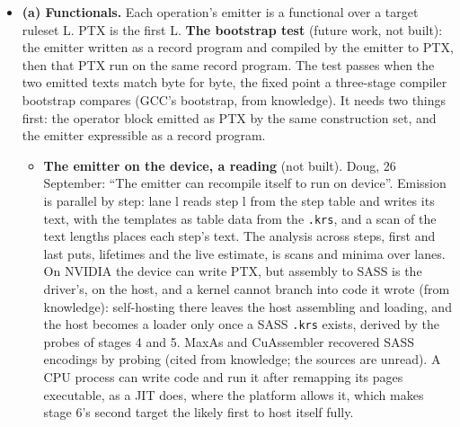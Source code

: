 \begin{enumerate}
\begin{itemize}
\item \textbf{(a) Functionals.} Each operation's emitter is a functional over a target ruleset L. PTX is the first L. \textbf{The bootstrap test} (future work, not built): the emitter written as a record program and compiled by the emitter to PTX, then that PTX run on the same record program. The test passes when the two emitted texts match byte for byte, the fixed point a three-stage compiler bootstrap compares (GCC's bootstrap, from knowledge). It needs two things first: the operator block emitted as PTX by the same construction set, and the emitter expressible as a record program.

\begin{itemize}
\item \textbf{The emitter on the device, a reading} (not built). Doug, 26 September: “The emitter can recompile itself to run on device”. Emission is parallel by step: lane l reads step l from the step table and writes its text, with the templates as table data from the \texttt{.krs}, and a scan of the text lengths places each step's text. The analysis across steps, first and last puts, lifetimes and the live estimate, is scans and minima over lanes. On NVIDIA the device can write PTX, but assembly to SASS is the driver's, on the host, and a kernel cannot branch into code it wrote (from knowledge): self-hosting there leaves the host assembling and loading, and the host becomes a loader only once a SASS \texttt{.krs} exists, derived by the probes of stages 4 and 5. MaxAs and CuAssembler recovered SASS encodings by probing (cited from knowledge; the sources are unread). A CPU process can write code and run it after remapping its pages executable, as a JIT does, where the platform allows it, which makes stage 6's second target the likely first to host itself fully.

\end{itemize}
\end{itemize}
\end{enumerate}
